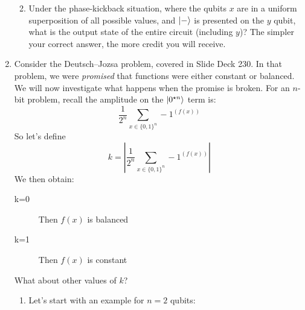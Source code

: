 \documentclass[12pt]{article}
\begin{document}
\begin{enumerate}[font=\bfseries]
\begin{enumerate}[label=\theenumi.\arabic*]
        
        \item Under the phase-kickback situation, where the qubits $x$ are in a uniform superposition of all possible values, and $\ket{-}$ is presented on the $y$ qubit, what is the output state of the entire circuit (including $y$)?  The simpler your correct answer, the more credit you will receive.
    \end{enumerate}
     \item{} Consider the Deutsch--Jozsa problem, covered in Slide Deck 230. In that problem, we were \emph{promised} that functions were either constant or balanced. We will now investigate what happens when the promise is broken.  For an $n$-bit problem, recall the amplitude on the $\ket{0^{\star n}}$ term is:
     \[
       \frac{1}{2^n}\sum_{x\in \{0,1\}^{n}} -1^{(f(x))}
     \]
     So let's define
         \[
       k = \left|\frac{1}{2^n}\sum_{x\in \{0,1\}^{n}} -1^{(f(x))}\right|
     \]
     We then obtain:
     \begin{description}
         \item[k=0] Then $f(x)$ is balanced
         \item[k=1] Then $f(x)$ is constant
     \end{description}
     What about other values of $k$?
    \begin{enumerate}[label=\theenumi.\arabic*]
        \item Let's start with an example for $n = 2$ qubits:
        \begin{center}
            \begin{tabular}{c|c}

\end{tabular}
\end{center}
\end{enumerate}
\end{enumerate}
\end{document}
